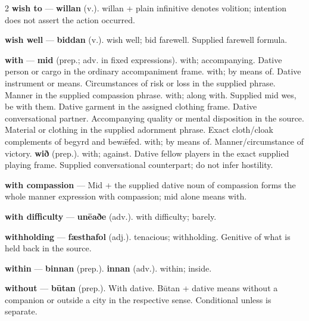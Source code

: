 \begin{multicols}{2}
\textbf{wish to} — \textbf{willan} (v.). willan + plain infinitive denotes volition; intention does not assert the action occurred.\par
\textbf{wish well} — \textbf{biddan} (v.). wish well; bid farewell. Supplied farewell formula.\par
\textbf{with} — \textbf{mid} (prep.; adv. in fixed expressions). with; accompanying. Dative person or cargo in the ordinary accompaniment frame. with; by means of. Dative instrument or means. Circumstances of risk or loss in the supplied phrase. Manner in the supplied compassion phrase. with; along with. Supplied mid wes, be with them. Dative garment in the assigned clothing frame. Dative conversational partner. Accompanying quality or mental disposition in the source. Material or clothing in the supplied adornment phrase. Exact cloth/cloak complements of begyrd and bewǣfed. with; by means of. Manner/circumstance of victory. \textbf{wið} (prep.). with; against. Dative fellow players in the exact supplied playing frame. Supplied conversational counterpart; do not infer hostility.\par
\textbf{with compassion} — Mid + the supplied dative noun of compassion forms the whole manner expression with compassion; mid alone means with.\par
\textbf{with difficulty} — \textbf{unēaðe} (adv.). with difficulty; barely.\par
\textbf{withholding} — \textbf{fæsthafol} (adj.). tenacious; withholding. Genitive of what is held back in the source.\par
\textbf{within} — \textbf{binnan} (prep.).  \textbf{innan} (adv.). within; inside.\par
\textbf{without} — \textbf{būtan} (prep.). With dative. Būtan + dative means without a companion or outside a city in the respective sense. Conditional unless is separate.\par

\end{multicols}
